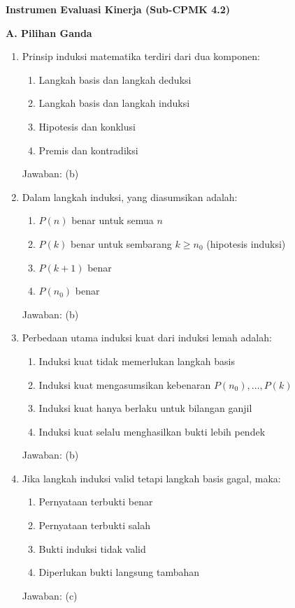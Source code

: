 \documentclass[../main]{subfiles}
\begin{document}
\begin{asesmen}
\textbf{Instrumen Evaluasi Kinerja (Sub-CPMK 4.2)}

\textbf{A. Pilihan Ganda}
\begin{enumerate}
  \item Prinsip induksi matematika terdiri dari dua komponen:
  \begin{enumerate}
    \item Langkah basis dan langkah deduksi
    \item Langkah basis dan langkah induksi
    \item Hipotesis dan konklusi
    \item Premis dan kontradiksi
  \end{enumerate}
  Jawaban: (b)

  \item Dalam langkah induksi, yang diasumsikan adalah:
  \begin{enumerate}
    \item $P(n)$ benar untuk semua $n$
    \item $P(k)$ benar untuk sembarang $k \geq n_0$ (hipotesis induksi)
    \item $P(k+1)$ benar
    \item $P(n_0)$ benar
  \end{enumerate}
  Jawaban: (b)

  \item Perbedaan utama induksi kuat dari induksi lemah adalah:
  \begin{enumerate}
    \item Induksi kuat tidak memerlukan langkah basis
    \item Induksi kuat mengasumsikan kebenaran $P(n_0), \ldots, P(k)$
    \item Induksi kuat hanya berlaku untuk bilangan ganjil
    \item Induksi kuat selalu menghasilkan bukti lebih pendek
  \end{enumerate}
  Jawaban: (b)

  \item Jika langkah induksi valid tetapi langkah basis gagal, maka:
  \begin{enumerate}
    \item Pernyataan terbukti benar
    \item Pernyataan terbukti salah
    \item Bukti induksi tidak valid
    \item Diperlukan bukti langsung tambahan
  \end{enumerate}
  Jawaban: (c)


\end{enumerate}
\end{asesmen}
\end{document}
